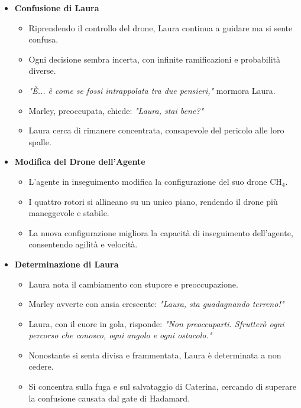 \begin{itemize}
    \item \textbf{Confusione di Laura}
    \begin{itemize}
        \item Riprendendo il controllo del drone, Laura continua a guidare ma si sente confusa.
        \item Ogni decisione sembra incerta, con infinite ramificazioni e probabilità diverse.
        \item \emph{"È... è come se fossi intrappolata tra due pensieri,"} mormora Laura.
        \item Marley, preoccupata, chiede: \emph{"Laura, stai bene?"}
        \item Laura cerca di rimanere concentrata, consapevole del pericolo alle loro spalle.
    \end{itemize}
    
    \item \textbf{Modifica del Drone dell'Agente}
    \begin{itemize}
        \item L'agente in inseguimento modifica la configurazione del suo drone CH$_4$.
        \item I quattro rotori si allineano su un unico piano, rendendo il drone più maneggevole e stabile.
        \item La nuova configurazione migliora la capacità di inseguimento dell'agente, consentendo agilità e velocità.
    \end{itemize}
    
    \item \textbf{Determinazione di Laura}
    \begin{itemize}
        \item Laura nota il cambiamento con stupore e preoccupazione.
        \item Marley avverte con ansia crescente: \emph{"Laura, sta guadagnando terreno!"}
        \item Laura, con il cuore in gola, risponde: \emph{"Non preoccuparti. Sfrutterò ogni percorso che conosco, ogni angolo e ogni ostacolo."}
        \item Nonostante si senta divisa e frammentata, Laura è determinata a non cedere.
        \item Si concentra sulla fuga e sul salvataggio di Caterina, cercando di superare la confusione causata dal gate di Hadamard.
    \end{itemize}
\end{itemize}

